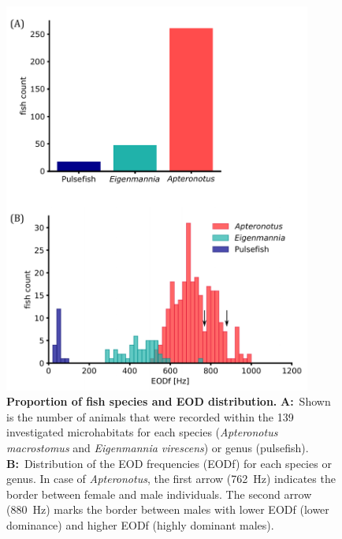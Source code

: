 \begin{figure}[H]
    \centering
    \includegraphics[width=0.9\textwidth]{pictures/Results/fish_count_EOD.pdf}
    \caption{\textbf{Proportion of fish species and EOD distribution.} \textbf{A:}~Shown is the number of animals that were recorded within the 139 investigated microhabitats for each species (\textit{Apteronotus macrostomus} and \textit{Eigenmannia virescens}) or genus (pulsefish). \textbf{B:}~Distribution of the EOD frequencies (EODf) for each species or genus. In case of \textit{Apteronotus}, the first arrow (762~Hz) indicates the border between female and male individuals. The second arrow (880~Hz) marks the border between males with lower EODf (lower dominance) and higher EODf (highly dominant males).}
    \label{fig:fish_count_eod}
\end{figure}


